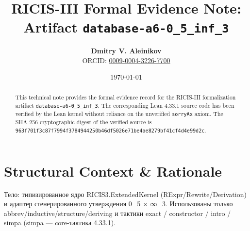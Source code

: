 \documentclass[11pt,a4paper]{article}
\title{\textbf{RICIS-III Formal Evidence Note:\\Artifact \texttt{database-a6-0_5_inf_3}}}
\author{\textbf{Dmitry V. Aleinikov}\\ORCID: \href{https://orcid.org/0009-0004-3226-7700}{0009-0004-3226-7700}}
\date{\today}
\begin{document}
\maketitle

\begin{abstract}
This technical note provides the formal evidence record for the RICIS-III formalization artifact \texttt{database-a6-0_5_inf_3}.
The corresponding Lean 4.33.1 source code has been verified by the Lean kernel without reliance on the unverified \texttt{sorryAx} axiom.
The SHA-256 cryptographic digest of the verified source is \texttt{963f701f3c87f7994f3784944250b46df5026e71be4ae8279bf41cf4d4e99d2c}.
\end{abstract}

\section{Structural Context & Rationale}
Тело: типизированное ядро RICIS3.ExtendedKernel (RExpr/Rewrite/Derivation) и адаптер сгенерированного утверждения 0_5 × ∞_3. Использованы только abbrev/inductive/structure/deriving и тактики exact / constructor / intro / simpa (simpa — core-тактика 4.33.1).
\end{document}
